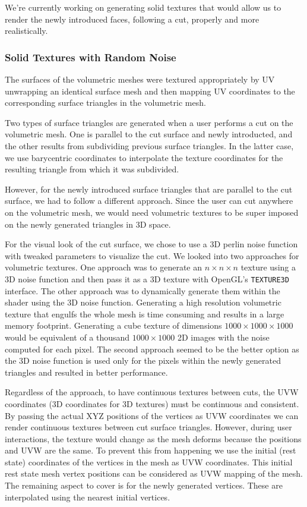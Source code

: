 We're currently working on generating solid textures that would allow us to render the newly introduced faces, following a cut, properly and more realistically.

\subsubsection{Solid Textures with Random Noise}
The surfaces of the volumetric meshes were textured appropriately by UV unwrapping an identical surface mesh and then mapping UV coordinates to the corresponding surface triangles in the volumetric mesh.

Two types of surface triangles are generated when a user performs a cut on the volumetric mesh. One is parallel to the cut surface and newly introducted, and the other results from subdividing previous surface triangles. In the latter case, we use barycentric coordinates to interpolate the texture coordinates for the resulting triangle from which it was subdivided.

However, for the newly introduced surface triangles that are parallel to the cut surface, we had to follow a different approach. Since the user can cut anywhere on the volumetric mesh, we would need volumetric textures to be super imposed on the newly generated triangles in 3D space.

For the visual look of the cut surface, we chose to use a 3D perlin noise function with tweaked parameters to visualize the cut. We looked into two approaches for volumetric textures. One approach was to generate an $n \times n \times n$ texture using a 3D noise function and then pass it as a 3D texture with OpenGL's \texttt{TEXTURE3D} interface. The other approach was to dynamically generate them within the shader using the 3D noise function. Generating a high resolution volumetric texture that engulfs the whole mesh is time consuming and results in a large memory footprint. Generating a cube texture of dimensions $1000 \times 1000 \times 1000$ would be equivalent of a thousand $1000 \times 1000$ 2D images with the noise computed for each pixel. The second approach seemed to be the better option as the 3D noise function is used only for the pixels within the newly generated triangles and resulted in better performance.

Regardless of the approach, to have continuous textures between cuts, the UVW coordinates (3D coordinates for 3D textures) must be continuous and consistent. By passing the actual XYZ positions of the vertices as UVW coordinates we can render continuous textures between cut surface triangles. However, during user interactions, the texture would change as the mesh deforms because the positions and UVW are the same. To prevent this from happening we use the initial (rest state) coordinates of the vertices in the mesh as UVW coordinates. This initial rest state mesh vertex positions can be considered as UVW mapping of the mesh. The remaining aspect to cover is for the newly generated vertices. These are interpolated using the nearest initial vertices.

